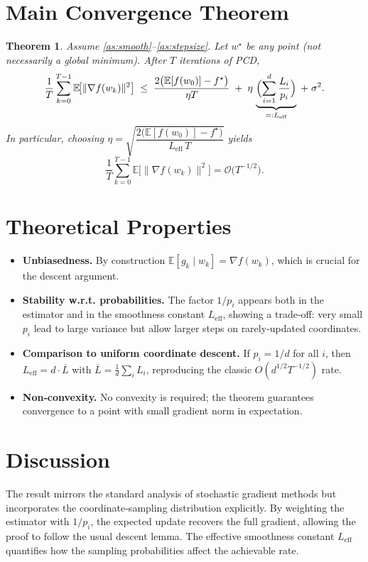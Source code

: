 \documentclass{article}
\newtheorem{theorem}{Theorem}
\begin{document}
\section*{Main Convergence Theorem}
\begin{theorem}\label{thm:main}
Assume \ref{as:smooth}–\ref{as:stepsize}. Let $w^\star$ be any point (not necessarily a global minimum). After $T$ iterations of PCD,
\[
    \frac{1}{T}\sum_{k=0}^{T-1}\mathbb{E}\!\bigl[\|\nabla f(w_k)\|^2\bigr]
    \;\le\;
    \frac{2\bigl(\mathbb{E}[f(w_0)]-f^\star\bigr)}{\eta T}
    \;+\;
    \eta\,\underbrace{\Bigl(\sum_{i=1}^d\frac{L_i}{p_i}\Bigr)}_{=:L_{\text{eff}}}
    \;+\;
    \sigma^2 .
\]
In particular, choosing $\eta=\sqrt{\dfrac{2\bigl(\mathbb{E}[f(w_0)]-f^\star\bigr)}{L_{\text{eff}}\,T}}$ yields
\[
    \frac{1}{T}\sum_{k=0}^{T-1}\mathbb{E}\!\bigl[\|\nabla f(w_k)\|^2\bigr]
    =\mathcal{O}\!\bigl(T^{-1/2}\bigr).
\]
\end{theorem}

\section*{Theoretical Properties}
\begin{itemize}[leftmargin=*]
    \item \textbf{Unbiasedness.} By construction $\mathbb{E}[g_k\mid w_k]=\nabla f(w_k)$, which is crucial for the descent argument.
    \item \textbf{Stability w.r.t. probabilities.} The factor $1/p_i$ appears both in the estimator and in the smoothness constant $L_{\text{eff}}$, showing a trade‑off: very small $p_i$ lead to large variance but allow larger steps on rarely‑updated coordinates.
    \item \textbf{Comparison to uniform coordinate descent.} If $p_i=1/d$ for all $i$, then $L_{\text{eff}} = d\cdot \overline{L}$ with $\overline{L}=\frac{1}{d}\sum_i L_i$, reproducing the classic $O(d^{1/2}T^{-1/2})$ rate.
    \item \textbf{Non‑convexity.} No convexity is required; the theorem guarantees convergence to a point with small gradient norm in expectation.
\end{itemize}

\section*{Discussion}
The result mirrors the standard analysis of stochastic gradient methods but incorporates the coordinate‑sampling distribution explicitly. By weighting the estimator with $1/p_i$, the expected update recovers the full gradient, allowing the proof to follow the usual descent lemma. The effective smoothness constant $L_{\text{eff}}$ quantifies how the sampling probabilities affect the achievable rate.
\end{document}
